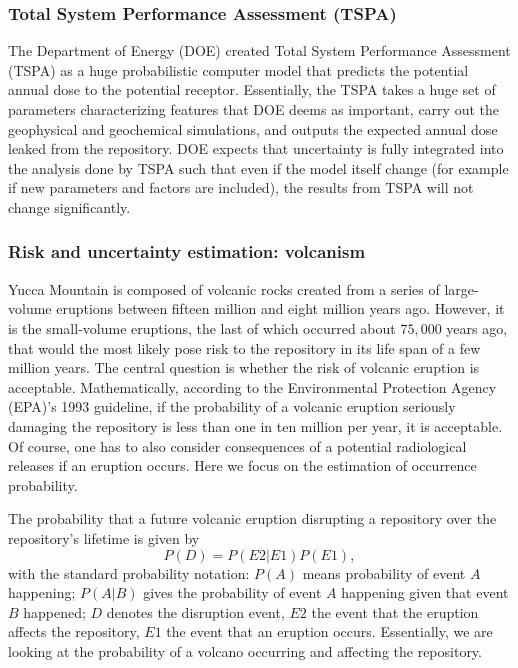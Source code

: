 \documentclass[nofootinbib,preprint,aps]{revtex4-1}
\begin{document}
        \subsubsection{Total System Performance Assessment (TSPA)}
        The Department of Energy (DOE) created Total System Performance Assessment (TSPA) as a huge probabilistic
        computer model that predicts the potential annual dose to the potential receptor.
        Essentially, the TSPA takes a huge set of parameters characterizing features that DOE deems as important,
        carry out the geophysical and geochemical simulations,
        and outputs the expected annual dose leaked from the repository.
        DOE expects that
        uncertainty is fully integrated into the analysis done by TSPA such that even if the model itself change
        (for example if new parameters and factors are included), the results from TSPA will not change
        significantly.\cite{cv14,ocrwm02} 

        \subsubsection{Risk and uncertainty estimation: volcanism}
        \label{sec:volcano}
        Yucca Mountain is composed of volcanic rocks created from a series of large-volume eruptions between
        fifteen million and eight million years ago. However, it is the small-volume eruptions, the last of
        which occurred about $75,000$ years ago, that would the most likely pose risk to the repository
        in its life span of a few million years.
        The central question is whether the risk of volcanic eruption is acceptable. Mathematically,
        according to the Environmental Protection Agency (EPA)'s 1993 guideline,
        if the probability of a volcanic eruption seriously damaging the repository is less than
        one in ten million per year, it is acceptable.\cite{epa93}
        Of course, one has to also consider consequences of a potential radiological releases if an eruption
        occurs. Here we focus on the estimation of occurrence probability.

        The probability that a future volcanic eruption disrupting a repository over
        the repository's lifetime is given by
        \begin{equation}
            \label{eq:prob}
            P(D) = P(E2|E1)P(E1),
        \end{equation}
        with the standard probability notation: 
        $P(A)$ means probability of event $A$ happening;
        $P(A|B)$ gives the probability of event $A$ happening given that event $B$ happened;
        $D$ denotes the disruption event,
        $E2$ the event that the eruption affects the repository, $E1$ the event that an eruption occurs.
        Essentially, we are looking at the probability of a volcano occurring and affecting the repository.
\end{document}
